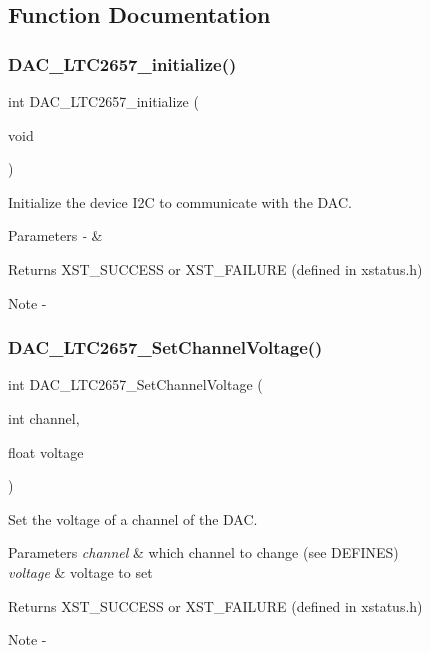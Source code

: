 \subsection{Function Documentation}
\mbox{\label{iic___d_a_c___l_t_c2657_8h_a39243dba9cbf38663f886dd1197bc399}} 
\subsubsection{DAC\_LTC2657\_initialize()}
{\footnotesize\ttfamily int D\+A\+C\+\_\+\+L\+T\+C2657\+\_\+initialize (\begin{DoxyParamCaption}\item[{void}]{ }\end{DoxyParamCaption})}



Initialize the device I2C to communicate with the D\+AC. 


\begin{DoxyParams}{Parameters}
{\em -\/} & \\
\hline
\end{DoxyParams}
\begin{DoxyReturn}{Returns}
X\+S\+T\+\_\+\+S\+U\+C\+C\+E\+SS or X\+S\+T\+\_\+\+F\+A\+I\+L\+U\+RE (defined in xstatus.\+h)
\end{DoxyReturn}
\begin{DoxyNote}{Note}
-\/ 
\end{DoxyNote}
\mbox{\label{iic___d_a_c___l_t_c2657_8h_a8fc10bb603177039a45001f7b24b4622}} 
\subsubsection{DAC\_LTC2657\_SetChannelVoltage()}
{\footnotesize\ttfamily int D\+A\+C\+\_\+\+L\+T\+C2657\+\_\+\+Set\+Channel\+Voltage (\begin{DoxyParamCaption}\item[{int}]{channel,  }\item[{float}]{voltage }\end{DoxyParamCaption})}



Set the voltage of a channel of the D\+AC. 


\begin{DoxyParams}{Parameters}
{\em channel} & which channel to change (see D\+E\+F\+I\+N\+ES) \\
\hline
{\em voltage} & voltage to set\\
\hline
\end{DoxyParams}
\begin{DoxyReturn}{Returns}
X\+S\+T\+\_\+\+S\+U\+C\+C\+E\+SS or X\+S\+T\+\_\+\+F\+A\+I\+L\+U\+RE (defined in xstatus.\+h)
\end{DoxyReturn}
\begin{DoxyNote}{Note}
-\/ 
\end{DoxyNote}

